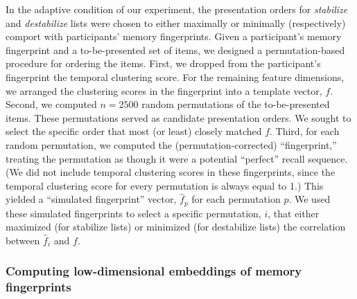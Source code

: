 \documentclass[11pt]{article}
\begin{document}
In the adaptive condition of our experiment, the presentation orders for
\textit{stabilize} and \textit{destabilize} lists were chosen to either
maximally or minimally (respectively) comport with participants' memory
fingerprints. Given a participant's memory fingerprint and a to-be-presented
set of items, we designed a permutation-based procedure for ordering the items.
First, we dropped from the participant's fingerprint the temporal clustering
score. For the remaining feature dimensions, we arranged the clustering scores
in the fingerprint into a template vector, $f$. Second, we computed $n = 2500$
random permutations of the to-be-presented items. These permutations served as
candidate presentation orders. We sought to select the specific order that most
(or least) closely matched $f$. Third, for each random permutation, we computed
the (permutation-corrected) ``fingerprint,'' treating the permutation as though
it were a potential ``perfect'' recall sequence. (We did not include temporal
clustering scores in these fingerprints, since the temporal clustering score
for every permutation is always equal to 1.) This yielded a ``simulated
fingerprint'' vector, $\hat{f}_p$ for each permutation $p$. We used these
simulated fingerprints to select a specific permutation, $i$, that either
maximized (for stabilize lists) or minimized (for destabilize lists) the
correlation between $\hat{f}_i$ and $f$.

\subsubsection*{Computing low-dimensional embeddings of memory fingerprints}
\end{document}
